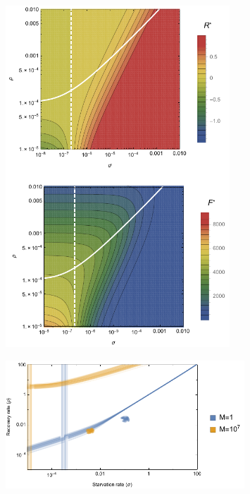 \documentclass[12pt,english]{article}
\begin{document}
\begin{spacing}{1.9}
\clearpage


 \begin{figure}[h]
 	\centering
 	\includegraphics[width=0.75\textwidth]{fig_FixedPoint.pdf}
 	\caption{
 	}
 	\label{Hopfb}
 \end{figure}


 \begin{figure}[h]
 	\centering
 	\includegraphics[width=0.8\textwidth]{fig_DataHopf.pdf}
 	\caption{
 	}
 	\label{DataHopf}
 \end{figure}
 

\end{spacing}
\end{document}
